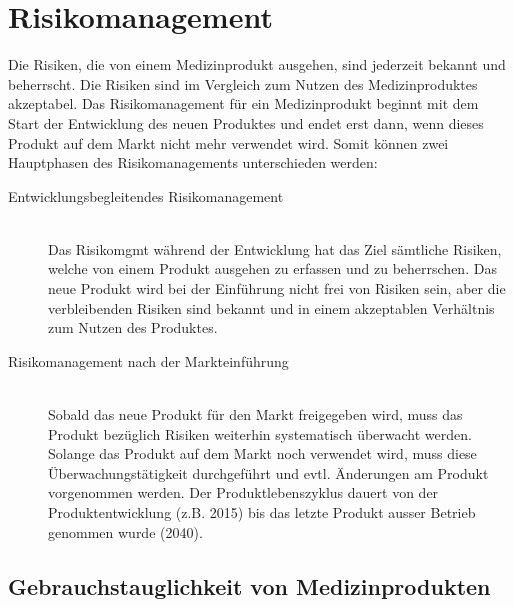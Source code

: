 \chapter{Risikomanagement}
\label{sec:risikomgmt}

Die Risiken, die von einem Medizinprodukt ausgehen, sind jederzeit bekannt und beherrscht. Die Risiken sind im Vergleich zum Nutzen des Medizinproduktes akzeptabel. Das Risikomanagement für ein Medizinprodukt beginnt mit dem Start der Entwicklung des neuen Produktes und endet erst dann, wenn dieses Produkt auf dem Markt nicht mehr verwendet wird. Somit können zwei Hauptphasen des Risikomanagements unterschieden werden:
\begin{description}
	\item[Entwicklungsbegleitendes Risikomanagement] \hfil \\
	Das Risikomgmt während der Entwicklung hat das Ziel sämtliche Risiken, welche von einem Produkt ausgehen zu erfassen und zu beherrschen. Das neue Produkt wird bei der Einführung nicht frei von Risiken sein, aber die verbleibenden Risiken sind bekannt und in einem akzeptablen Verhältnis zum Nutzen des Produktes.
	
	\item[Risikomanagement nach der Markteinführung] \hfil \\
	Sobald das neue Produkt für den Markt freigegeben wird, muss das Produkt bezüglich Risiken weiterhin systematisch überwacht werden. Solange das Produkt auf dem Markt noch verwendet wird, muss diese Überwachungstätigkeit durchgeführt und evtl. Änderungen am Produkt vorgenommen werden. Der Produktlebenszyklus dauert von der Produktentwicklung (z.B. 2015) bis das letzte Produkt ausser Betrieb genommen wurde (2040).
\end{description}

\section{Gebrauchstauglichkeit von Medizinprodukten}

